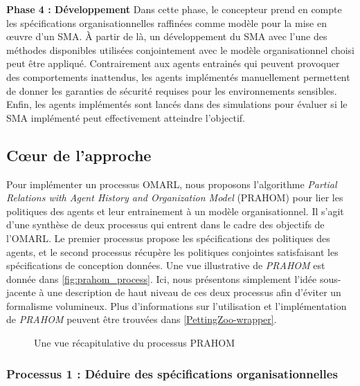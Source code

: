 \documentclass[contribution]{jfsma}
\begin{document}
\textbf{Phase 4 : Développement} \quad Dans cette phase, le concepteur prend en compte les spécifications organisationnelles raffinées comme modèle pour la mise en œuvre d'un SMA. À partir de là, un développement du SMA avec l'une des méthodes disponibles utilisées conjointement avec le modèle organisationnel choisi peut être appliqué. Contrairement aux agents entrainés qui peuvent provoquer des comportements inattendus, les agents implémentés manuellement permettent de donner les garanties de sécurité requises pour les environnements sensibles. Enfin, les agents implémentés sont lancés dans des simulations pour évaluer si le SMA implémenté peut effectivement atteindre l'objectif.

\subsection{Cœur de l'approche}

Pour implémenter un processus OMARL, nous proposons l'algorithme \emph{Partial Relations with Agent History and Organization Model} (PRAHOM) pour lier les politiques des agents et leur entrainement à un modèle organisationnel.
Il s'agit d'une synthèse de deux processus qui entrent dans le cadre des objectifs de l'OMARL. Le premier processus propose les spécifications des politiques des agents, et le second processus récupère les politiques conjointes satisfaisant les spécifications de conception données. Une vue illustrative de \emph{PRAHOM} est donnée dans \autoref{fig:prahom_process}.
Ici, nous présentons simplement l'idée sous-jacente à une description de haut niveau de ces deux processus afin d'éviter un formalisme volumineux. Plus d'informations sur l'utilisation et l'implémentation de \emph{PRAHOM} peuvent être trouvées dans \autoref{PettingZoo-wrapper}.

\begin{figure}[h!]
  \centering
  
  \caption{Une vue récapitulative du processus PRAHOM}
  \label{fig:prahom_process}
\end{figure}

\subsubsection{Processus 1 : Déduire des spécifications organisationnelles}
\end{document}
